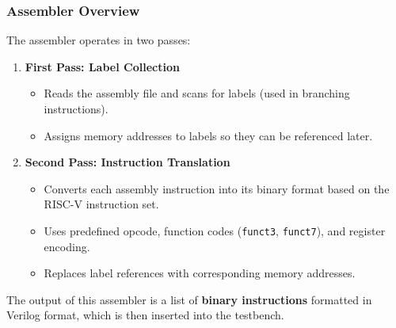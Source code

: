 \documentclass{article}
\numberwithin{figure}{section}
\numberwithin{table}{section}
\begin{document}
\subsubsection{Assembler Overview}
The assembler operates in two passes:
\begin{enumerate}
\item \textbf{First Pass: Label Collection}
\begin{itemize}
\item Reads the assembly file and scans for labels (used in branching instructions).
\item Assigns memory addresses to labels so they can be referenced later.
\end{itemize}
\item \textbf{Second Pass: Instruction Translation}
\begin{itemize}
\item Converts each assembly instruction into its binary format based on the RISC-V instruction set.
\item Uses predefined opcode, function codes (\texttt{funct3}, \texttt{funct7}), and register encoding.
\item Replaces label references with corresponding memory addresses.
\end{itemize}
\end{enumerate}
The output of this assembler is a list of \textbf{binary instructions} formatted in Verilog format, which is then inserted into the testbench.
\end{document}
